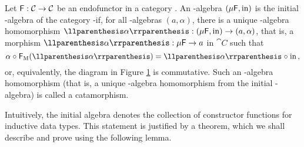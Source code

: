 \begin{definition}
  \label{def:initial-algebra}


  Let $\mathsf{F}: \mathcal{C} \to \mathcal{C}$ be an endofunctor in a category
  . An -algebra $(\mu\mathsf{F},\operatorname{in})$ is the initial
  -algebra of the category -\alg if, for all
  -algebras $(a,\alpha)$, there is a unique -algebra
  homomorphism $\cata\alpha: (\mu\func{F},\inmo) \to (a,\alpha)$, that
  is, a morphism $\cata\alpha: \mu\func{F} \to a$ in $\cat{C}$ such
  that
  \begin{equation}
    \label{eq:cata-charn}
    \alpha \comp \funcM{F}(\cata\alpha) = \cata\alpha \comp \inmo
    \text{,}
  \end{equation}
  or, equivalently, the diagram in Figure \ref{fig:cata-charn} is
  commutative. Such an -al\-ge\-bra homomorphism (that is, a
  unique -algebra homomorphism from the initial
  -algebra) is called a catamorphism.

  \begin{figure}[htb]
    \begin{center}
    \end{center}
    \caption{}
    \label{fig:cata-charn}
  \end{figure}

\end{definition}

Intuitively, the initial algebra denotes the collection of constructor
functions for inductive data types. This statement is justified by a
theorem, which we shall describe and prove using the following lemma.

